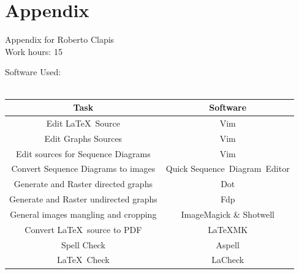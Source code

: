\documentclass{article}
\begin{document}
\section{Appendix}
Appendix for Roberto Clapis\\
Work hours: 15
\begin{center}
	Software Used:\\
	\-\\
	\begin{tabular}{*{2}{c}}
		\toprule
		Task & Software \\
		\midrule
		Edit \LaTeX\ Source & Vim\\
		Edit Graphs Sources & Vim\\
		Edit sources for Sequence Diagrams & Vim\\
		Convert Sequence Diagrams to images & Quick Sequence Diagram Editor\\
		Generate and Raster directed graphs& Dot\\
		Generate and Raster undirected graphs& Fdp\\
		General images mangling and cropping & ImageMagick \& Shotwell\\
		Convert \LaTeX\ source to PDF & \LaTeX\-MK\\
		Spell Check & Aspell \\
		\LaTeX\ Check & LaCheck\\
		\bottomrule
	\end{tabular}
\end{center}
\-\\
\-\\

\end{document}
